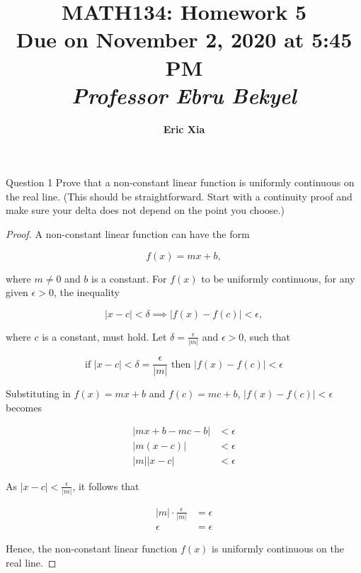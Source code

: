 \documentclass{article}
\title{
    \vspace{2in}
    \textmd{\textbf{MATH134: Homework 5}}\\
    \normalsize\vspace{0.1in}\small{Due on November 2, 2020 at 5:45 PM}\\
    \vspace{0.1in}\large{\textit{Professor Ebru Bekyel}}
    \vspace{3in}
}
\author{\textbf{Eric Xia}}
\date{}
\begin{document}
    \maketitle
    \pagebreak


    \thispagestyle{2}

    \begin{tbhtheorem}{Question 1}
        Prove that a non-constant linear function is uniformly continuous on the real line. (This should be straightforward. Start with a continuity proof and make sure your delta does not depend on the point you
        choose.)
    \end{tbhtheorem}

    \begin{proof}
        A non-constant linear function can have the form

        \[
            f(x) = mx + b,
        \]

        where $m\not = 0$ and $b$ is a constant. For $f(x)$ to be uniformly continuous, for any given $\epsilon > 0$, the inequality

        \[
            |x-c| < \delta \implies |f(x) - f(c)| < \epsilon,
        \]

        where $c$ is a constant, must hold. Let $\delta = \frac{\epsilon}{|m|}$ and $\epsilon > 0$, such that

        \[
            \text{if } |x-c| < \delta = \frac{\epsilon}{|m|} \text{ then } |f(x) - f(c)| < \epsilon
        \]

        Substituting in $f(x)=mx+b$ and $f(c)=mc+b$, $|f(x) - f(c)| < \epsilon$ becomes

        \begin{align*}
            |mx + b - mc - b| &< \epsilon \\
            |m(x-c)|          &< \epsilon \\
            |m||x-c|          &< \epsilon
        \end{align*}

        As $|x-c| < \frac{\epsilon}{|m|}$, it follows that

        \begin{align*}
            |m|\cdot \frac{\epsilon}{|m|} &= \epsilon \\
            \epsilon                      &= \epsilon
        \end{align*}

        Hence, the non-constant linear function $f(x)$ is uniformly continuous on the real line.
    \end{proof}
\end{document}
